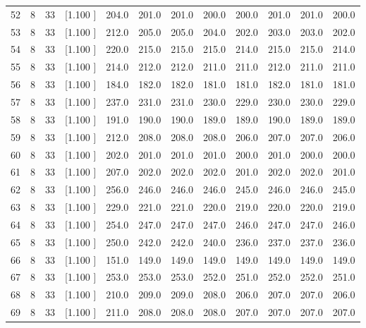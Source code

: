 \documentclass[12pt,a4paper]{article}
\begin{document}
\begin{center}
{\begin{tabular}{r r r r r r r r r r r r}
  52&  8& 33&[1.100     ]&   204.0&   201.0&   201.0&   200.0&   200.0&   201.0&   201.0&   200.0\\[-0.02in]
  53&  8& 33&[1.100     ]&   212.0&   205.0&   205.0&   204.0&   202.0&   203.0&   203.0&   202.0\\[-0.02in]
  54&  8& 33&[1.100     ]&   220.0&   215.0&   215.0&   215.0&   214.0&   215.0&   215.0&   214.0\\[-0.02in]
  55&  8& 33&[1.100     ]&   214.0&   212.0&   212.0&   211.0&   211.0&   212.0&   211.0&   211.0\\[-0.02in]
  56&  8& 33&[1.100     ]&   184.0&   182.0&   182.0&   181.0&   181.0&   182.0&   181.0&   181.0\\[-0.02in]
  57&  8& 33&[1.100     ]&   237.0&   231.0&   231.0&   230.0&   229.0&   230.0&   230.0&   229.0\\[-0.02in]
  58&  8& 33&[1.100     ]&   191.0&   190.0&   190.0&   189.0&   189.0&   190.0&   189.0&   189.0\\[-0.02in]
  59&  8& 33&[1.100     ]&   212.0&   208.0&   208.0&   208.0&   206.0&   207.0&   207.0&   206.0\\[-0.02in]
  60&  8& 33&[1.100     ]&   202.0&   201.0&   201.0&   201.0&   200.0&   201.0&   200.0&   200.0\\[-0.02in]
  61&  8& 33&[1.100     ]&   207.0&   202.0&   202.0&   202.0&   201.0&   202.0&   202.0&   201.0\\[-0.02in]
  62&  8& 33&[1.100     ]&   256.0&   246.0&   246.0&   246.0&   245.0&   246.0&   246.0&   245.0\\[-0.02in]
  63&  8& 33&[1.100     ]&   229.0&   221.0&   221.0&   220.0&   219.0&   220.0&   220.0&   219.0\\[-0.02in]
  64&  8& 33&[1.100     ]&   254.0&   247.0&   247.0&   247.0&   246.0&   247.0&   247.0&   246.0\\[-0.02in]
  65&  8& 33&[1.100     ]&   250.0&   242.0&   242.0&   240.0&   236.0&   237.0&   237.0&   236.0\\[-0.02in]
  66&  8& 33&[1.100     ]&   151.0&   149.0&   149.0&   149.0&   149.0&   149.0&   149.0&   149.0\\[-0.02in]
  67&  8& 33&[1.100     ]&   253.0&   253.0&   253.0&   252.0&   251.0&   252.0&   252.0&   251.0\\[-0.02in]
  68&  8& 33&[1.100     ]&   210.0&   209.0&   209.0&   208.0&   206.0&   207.0&   207.0&   206.0\\[-0.02in]
  69&  8& 33&[1.100     ]&   211.0&   208.0&   208.0&   208.0&   207.0&   207.0&   207.0&   207.0\\[-0.02in]

\end{tabular}}
\end{center}
\end{document}
